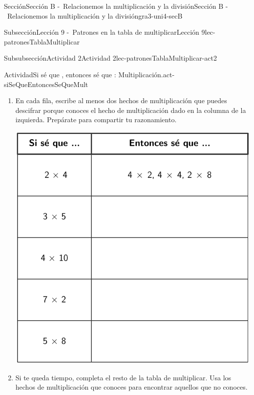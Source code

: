 \begin{sectionptx}{Sección}{Sección B -~Relacionemos la multiplicación y la división}{}{Sección B -~Relacionemos la multiplicación y la división}{}{}{gra3-uni4-secB}
\begin{subsectionptx}{Subsección}{Lección 9 -~Patrones en la tabla de multiplicar}{}{Lección 9}{}{}{lec-patronesTablaMultiplicar}
%
%
\typeout{************************************************}
\typeout{************************************************}
%
\clearpage
\begin{subsubsectionptx}{Subsubsección}{Actividad 2}{}{Actividad 2}{}{}{lec-patronesTablaMultiplicar-act2}
\begin{activity}{Actividad}{Si sé que \textellipsis{}, entonces sé que \textellipsis{}: Multiplicación.}{act-siSeQueEntoncesSeQueMult}%
%
\begin{enumerate}
\item{}En cada fila, escribe al menos dos hechos de multiplicación que puedes descifrar porque conoces el hecho de multiplicación dado en la columna de la izquierda. Prepárate para compartir tu razonamiento.%
\begin{image}{0}{1}{0}{}%
\includegraphics[max width=\linewidth, center]{external/tikz-source/siSeQueEntoncesSeQueMult-BLM-tab.pdf}
\end{image}%
\item{}Si te queda tiempo, completa el resto de la tabla de multiplicar. Usa los hechos de multiplicación que conoces para encontrar aquellos que no conoces.%
\end{enumerate}
\end{activity}%
\end{subsubsectionptx}

\end{subsectionptx}
\end{sectionptx}
